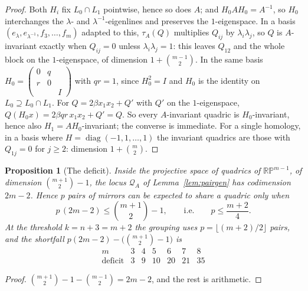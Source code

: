 \documentclass[11pt,a4paper]{article}
\theoremstyle{plain}
\newtheorem{proposition}[theorem]{Proposition}
\theoremstyle{definition}
\theoremstyle{remark}
\begin{document}
\begin{proof}
Both $H_i$ fix $L_0\cap L_1$ pointwise, hence so does $A$; and
$H_0AH_0=A^{-1}$, so $H_0$ interchanges the $\lambda$- and
$\lambda^{-1}$-eigenlines and preserves the $1$-eigenspace. In a basis
$(e_\lambda,e_{\lambda^{-1}},f_3,\dots,f_m)$ adapted to this, $\tau_A(Q)$ multiplies
$Q_{ij}$ by $\lambda_i\lambda_j$, so $Q$ is $A$-invariant exactly when $Q_{ij}=0$
unless $\lambda_i\lambda_j=1$: this leaves $Q_{12}$ and the whole block on the
$1$-eigenspace, of dimension $1+\binom{m-1}2$. In the same basis
$H_0=\left(\begin{smallmatrix}0&q&\\r&0&\\&&I\end{smallmatrix}\right)$ with $qr=1$,
since $H_0^2=I$ and $H_0$ is the identity on $L_0\supseteq L_0\cap L_1$. For
$Q=2\beta x_1x_2+Q'$ with $Q'$ on the $1$-eigenspace, $Q(H_0x)=2\beta qr\,x_1x_2+Q'=Q$.
So every $A$-invariant quadric is $H_0$-invariant, hence also $H_1=AH_0$-invariant;
the converse is immediate. For a single homology, in a basis where
$H=\operatorname{diag}(-1,1,\dots,1)$ the invariant quadrics are those with
$Q_{1j}=0$ for $j\ge2$: dimension $1+\binom m2$.
\end{proof}

\begin{proposition}[The deficit]\label{prop:deficit}
Inside the projective space of quadrics of $\mathbb{RP}^{m-1}$, of dimension
$\binom{m+1}2-1$, the locus $\mathcal Q_A$ of Lemma~\ref{lem:pairgen} has
codimension $2m-2$. Hence $p$ pairs of mirrors can be expected to share a quadric
only when
\[
  p\,(2m-2)\le\binom{m+1}2-1,\qquad\text{i.e.}\qquad p\le\frac{m+2}4 .
\]
At the threshold $k=n+3=m+2$ the grouping uses $p=\lfloor(m+2)/2\rfloor$ pairs, and
the shortfall $p(2m-2)-\bigl(\binom{m+1}2-1\bigr)$ is
\[
\begin{array}{c|cccccc}
 m       & 3 & 4 & 5 & 6 & 7 & 8\\\hline
 \text{deficit} & 3 & 9 & 10 & 20 & 21 & 35
\end{array}
\]
\end{proposition}

\begin{proof}
$\binom{m+1}2-1-\binom{m-1}2=2m-2$, and the rest is arithmetic.
\end{proof}
\end{document}
